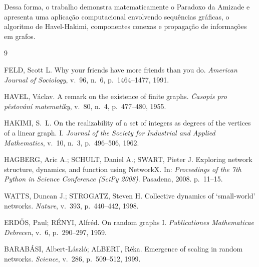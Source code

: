 \documentclass[12pt,a4paper]{article}
\theoremstyle{plain}
\theoremstyle{definition}
\theoremstyle{remark}
\begin{document}
Dessa forma, o trabalho demonstra matematicamente o
Paradoxo da Amizade e apresenta uma aplicação computacional
envolvendo sequências gráficas, o algoritmo de
Havel-Hakimi, componentes conexas e propagação de
informações em grafos.
\newpage
{}
{}
\begin{thebibliography}{9}
\singlespacing

FELD, Scott L. Why your friends have more friends than you do.
\emph{American Journal of Sociology}, v.~96, n.~6, p.~1464--1477, 1991.

HAVEL, Václav. A remark on the existence of finite graphs.
\emph{Časopis pro pěstování matematiky}, v.~80, n.~4, p.~477--480, 1955.

HAKIMI, S.~L. On the realizability of a set of integers as degrees of
the vertices of a linear graph. I. \emph{Journal of the Society for
Industrial and Applied Mathematics}, v.~10, n.~3, p.~496--506, 1962.

HAGBERG, Aric A.; SCHULT, Daniel A.; SWART, Pieter J. Exploring network
structure, dynamics, and function using NetworkX. In: \emph{Proceedings
of the 7th Python in Science Conference (SciPy 2008)}. Pasadena, 2008.
p.~11--15.


WATTS, Duncan J.; STROGATZ, Steven H. Collective dynamics of
`small-world' networks. \emph{Nature}, v.~393, p.~440--442, 1998.

ERDŐS, Paul; RÉNYI, Alfréd. On random graphs I. \emph{Publicationes
Mathematicae Debrecen}, v.~6, p.~290--297, 1959.

BARABÁSI, Albert-László; ALBERT, Réka. Emergence of scaling in random
networks. \emph{Science}, v.~286, p.~509--512, 1999.

\end{thebibliography}
\end{document}

